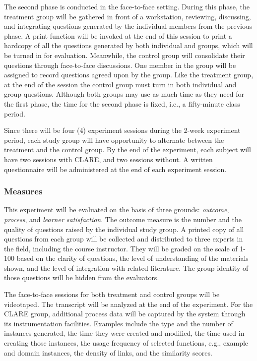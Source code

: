 The second phase is conducted in the face-to-face setting. During this
phase, the treatment group will be gathered in front of a workstation,
reviewing, discussing, and integrating questions generated by the
individual members from the previous phase. A print function will be
invoked at the end of this session to print a hardcopy of all the questions
generated by both individual and groups, which will be turned in for
evaluation. Meanwhile, the control group will consolidate their questions
through face-to-face discussions. One member in the group will be assigned
to record questions agreed upon by the group. Like the treatment group, at
the end of the session the control group must turn in both individual and
group questions. Although both groups may use as much time as they need for
the first phase, the time for the second phase is fixed, i.e., a
fifty-minute class period.

Since there will be four (4) experiment sessions during the 2-week
experiment period, each study group will have opportunity to alternate
between the treatment and the control group. By the end of the experiment,
each subject will have two sessions with CLARE, and two sessions without.
A written questionnaire will be administered at the end of each experiment
session.


\subsubsection{Measures}

This experiment will be evaluated on the basis of three grounds: {\it
outcome\/}, {\it process\/}, and {\it learner satisfaction\/}. The outcome
measure is the number and the quality of questions raised by the individual
study group. A printed copy of all questions from each group will be
collected and distributed to three experts in the field, including the
course instructor. They will be graded on the scale of 1-100 based on the
clarity of questions, the level of understanding of the materials shown,
and the level of integration with related literature. The group identity of
those questions will be hidden from the evaluators.

The face-to-face sessions for both treatment and control groups will
be videotaped. The transcript will be analyzed at the end of the
experiment. For the CLARE group, additional process data will be captured
by the system through its instrumentation facilities. Examples include the
type and the number of instances generated, the time they were created and
modified, the time used in creating those instances, the usage frequency of
selected functions, e.g., example and domain instances, the density of
links, and the similarity scores.

